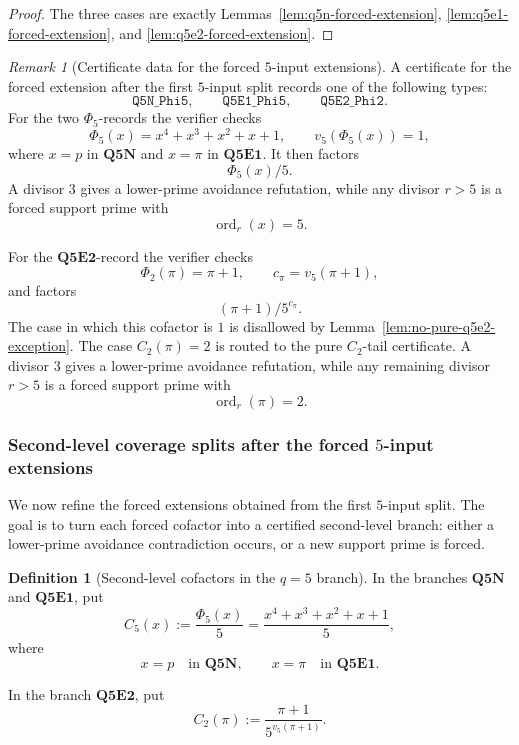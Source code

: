 \documentclass[11pt]{article}
\theoremstyle{definition}
\newtheorem{definition}[theorem]{Definition}
\theoremstyle{remark}
\newtheorem{remark}[theorem]{Remark}
\DeclareMathOperator{\ord}{ord}
\begin{document}
\begin{proof}
The three cases are exactly Lemmas~\ref{lem:q5n-forced-extension},
\ref{lem:q5e1-forced-extension}, and \ref{lem:q5e2-forced-extension}.
\end{proof}

\begin{remark}[Certificate data for the forced $5$-input extensions]
A certificate for the forced extension after the first \(5\)-input split records
one of the following types:
\[
  \mathtt{Q5N\_Phi5},
  \qquad
  \mathtt{Q5E1\_Phi5},
  \qquad
  \mathtt{Q5E2\_Phi2}.
\]
For the two \(\Phi_5\)-records the verifier checks
\[
  \Phi_5(x)=x^4+x^3+x^2+x+1,
  \qquad
  v_5(\Phi_5(x))=1,
\]
where \(x=p\) in \(\mathbf{Q5N}\) and \(x=\pi\) in \(\mathbf{Q5E1}\).
It then factors
\[
  \Phi_5(x)/5.
\]
A divisor \(3\) gives a lower-prime avoidance refutation, while any divisor
\(r>5\) is a forced support prime with
\[
  \ord_r(x)=5.
\]

For the \(\mathbf{Q5E2}\)-record the verifier checks
\[
  \Phi_2(\pi)=\pi+1,
  \qquad
  c_\pi=v_5(\pi+1),
\]
and factors
\[
  (\pi+1)/5^{c_\pi}.
\]
The case in which this cofactor is \(1\) is disallowed by
Lemma~\ref{lem:no-pure-q5e2-exception}.  The case \(C_2(\pi)=2\) is routed to
the pure \(C_2\)-tail certificate.  A divisor \(3\) gives a lower-prime
avoidance refutation, while any remaining divisor \(r>5\) is a forced support prime with
\[
  \ord_r(\pi)=2.
\]
\end{remark}

\subsubsection{Second-level coverage splits after the forced $5$-input extensions}

We now refine the forced extensions obtained from the first \(5\)-input split.
The goal is to turn each forced cofactor into a certified second-level branch:
either a lower-prime avoidance contradiction occurs, or a new support prime is
forced.

\begin{definition}[Second-level cofactors in the \(q=5\) branch]
In the branches \(\mathbf{Q5N}\) and \(\mathbf{Q5E1}\), put
\[
  C_5(x):=\frac{\Phi_5(x)}5
  =
  \frac{x^4+x^3+x^2+x+1}{5},
\]
where
\[
  x=p
  \quad\text{in }\mathbf{Q5N},
  \qquad
  x=\pi
  \quad\text{in }\mathbf{Q5E1}.
\]

In the branch \(\mathbf{Q5E2}\), put
\[
  C_2(\pi):=
  \frac{\pi+1}{5^{v_5(\pi+1)}}.
\]
\end{definition}
\end{document}
